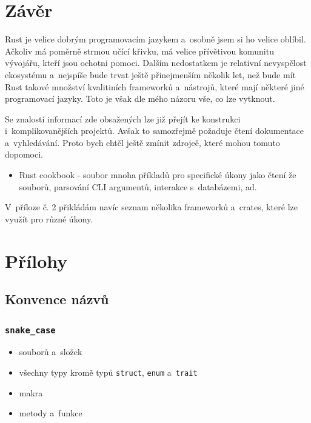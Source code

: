\documentclass[a4paper, 12pt, twoside]{article} %
\begin{document}
\section{Závěr}
	Rust je velice dobrým programovacím jazykem a~osobně jsem si ho velice oblíbil. Ačkoliv má poměrně strmou učící křivku, má velice přívětivou komunitu vývojářu, kteří jsou ochotni pomoci. Dalším nedostatkem je relativní nevyspělost ekosystému a~nejspíše bude trvat ještě přinejmenším několik let, než bude mít Rust takové množství kvalitiních frameworků a~nástrojů, které mají některé jiné programovací jazyky. Toto je však dle mého názoru vše, co lze vytknout.
	
	Se znalostí informací zde obsažených lze již přejít ke konstrukci i~komplikovanějších projektů. Avšak to samozřejmě požaduje čtení dokumentace a~vyhledávání. Proto bych chtěl ještě zmínit zdrojeě, které mohou tomuto dopomoci.
	\begin{itemize}
		\item Rust cookbook\cite{cookbook} - soubor mnoha příkladů pro specifické úkony jako čtení že souborů, parsování CLI argumentů, interakce s~databázemi, ad.
	\end{itemize}
	
	V~příloze č. 2 přikládám navíc seznam několika frameworků a~crates, které lze využít pro různé úkony.





\section{Přílohy}
	\subsection{Konvence názvů}
		\hypertarget{konvence_nazvu}{}


		\subsubsection*{\texttt{snake\_case}}
			\begin{itemize}
				\item souborů a~složek
				\item všechny typy kromě typů \texttt{struct}, \texttt{enum} a~\texttt{trait}
				\item makra
				\item metody a~funkce
			\end{itemize}
\end{document}
